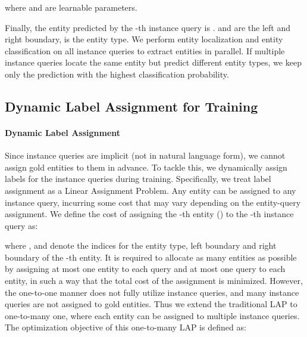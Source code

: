 \documentclass[11pt]{article}
\begin{document}
\noindent where  and  are learnable parameters.

Finally, the entity predicted by the -th instance query is .  and  are the left and right boundary,  is the entity type. 
We perform entity localization and entity classification on all instance queries to extract entities in parallel.
If multiple instance queries locate the same entity but predict different entity types, we keep only the prediction with the highest classification probability.










\subsection{Dynamic Label Assignment for Training}
\label{label}


\paragraph{Dynamic Label Assignment}

Since instance queries are implicit (not in natural language form), we cannot assign gold entities to them in advance. To tackle this, we dynamically assign labels for the instance queries during training. Specifically, we treat label assignment as a Linear Assignment Problem. Any entity can be assigned to any instance query, incurring some cost that may vary depending on the entity-query assignment. We define the cost of assigning the -th entity () to the -th instance query as:




\noindent where ,  and  denote the indices for the entity type, left boundary and right boundary of the -th entity.
It is required to allocate as many entities as possible by assigning at most one entity to each query and at most one query to each entity, in such a way that the total cost of the assignment is minimized.
However, the one-to-one manner does not fully utilize instance queries, and many instance queries are not assigned to gold entities. Thus
we extend the traditional LAP to one-to-many one, where each entity can be assigned to multiple instance queries. The optimization objective of this one-to-many LAP is defined as:
\end{document}
